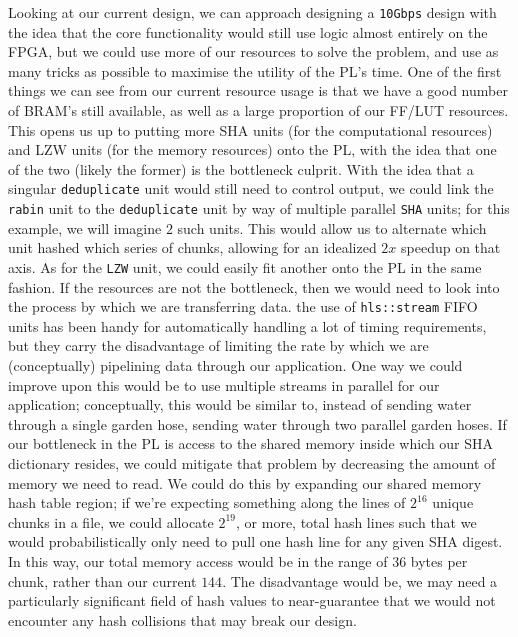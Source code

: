 \documentclass{article}
\begin{document}
Looking at our current design, we can approach designing a \texttt{10Gbps} design with the idea that the core functionality would still use logic almost entirely on the FPGA, but we could use more of our resources to solve the problem, and use as many tricks as possible to maximise the utility of the PL's time.
\newline\newline
One of the first things we can see from our current resource usage is that we have a good number of BRAM's still available, as well as a large proportion of our FF/LUT resources.
This opens us up to putting more SHA units (for the computational resources) and LZW units (for the memory resources) onto the PL, with the idea that one of the two (likely the former) is the bottleneck culprit.
\newline
With the idea that a singular \texttt{deduplicate} unit would still need to control output, we could link the \texttt{rabin} unit to the \texttt{deduplicate} unit by way of multiple parallel \texttt{SHA} units; for this example, we will imagine $2$ such units. This would allow us to alternate which unit hashed which series of chunks, allowing for an idealized $2x$ speedup on that axis.
\newline
As for the \texttt{LZW} unit, we could easily fit another onto the PL in the same fashion.
\newline\newline
If the resources are not the bottleneck, then we would need to look into the process by which we are transferring data. the use of \texttt{hls::stream} FIFO units has been handy for automatically handling a lot of timing requirements, but they carry the disadvantage of limiting the rate by which we are (conceptually) pipelining data through our application.
\newline\newline
One way we could improve upon this would be to use multiple streams in parallel for our application; conceptually, this would be similar to, instead of sending water through a single garden hose, sending water through two parallel garden hoses.
\newline\newline
If our bottleneck in the PL is access to the shared memory inside which our SHA dictionary resides, we could mitigate that problem by decreasing the amount of memory we need to read. We could do this by expanding our shared memory hash table region; if we're expecting something along the lines of $2^{16}$ unique chunks in a file, we could allocate $2^{19}$, or more, total hash lines such that we would probabilistically only need to pull one hash line for any given SHA digest.
\newline
In this way, our total memory access would be in the range of $36$ bytes per chunk, rather than our current $144$. The disadvantage would be, we may need a particularly significant field of hash values to near-guarantee that we would not encounter any hash collisions that may break our design.
\newline\newline
\end{document}
